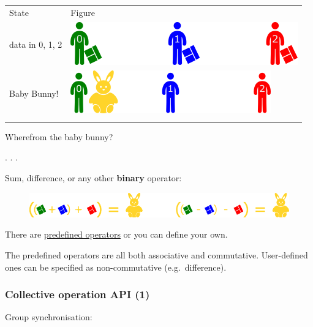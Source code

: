 \begin{longtable}[c]{@{}ll@{}}
\toprule\addlinespace
State & Figure
\\\addlinespace
\midrule\endhead
data in 0, 1, 2 & \includegraphics{06MPI/figures/collective.png}
\\\addlinespace
Baby Bunny! & \includegraphics{06MPI/figures/reduce1.png}
\\\addlinespace
\bottomrule
\end{longtable}

Wherefrom the baby bunny?

. . .

Sum, difference, or any other \textbf{binary} operator:

\begin{figure}[htbp]
\centering
\includegraphics{06MPI/figures/BunnyOps.png}
\end{figure}

There are
\href{https://www.open-mpi.org/doc/v3.0/man3/MPI_Reduce.3.php\#sect10}{predefined
operators} or you can define your own.

The predefined operators are all both associative and commutative.
User-defined ones can be specified as non-commutative (e.g.~difference).

\subsubsection{Collective operation API
(1)}\label{collective-operation-api-1}

Group synchronisation:

\begin{Shaded}
\begin{Highlighting}[]
 
\end{Highlighting}
\end{Shaded}

